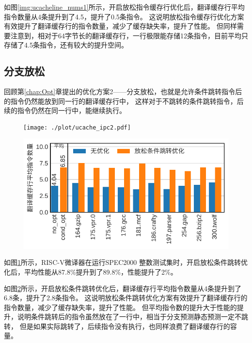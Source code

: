 如图\ref{img:ucacheline_nums1}所示，开启放松指令缓存行优化后，翻译缓存行平均指令数量从4条提升到了4.5，提升了0.5条指令。
这说明放松指令缓存行优化方案有效提升了翻译缓存行的指令数量，减少了缓存缺失率，提升了性能。
但同样需要注意到，相对于64字节长的翻译缓存行，一行极限能存储12条指令，目前平均只存储了4.5条指令，还有较大的提升空间。

\subsection{分支放松}

回顾第\ref{chap:Opt}章提出的优化方案2——分支放松，也就是允许条件跳转指令后的指令仍然能放到同一行的翻译缓存行中，
这样对于不跳转的条件跳转指令，后续的指令仍然在同一行中，能继续执行。

\begin{figure}[!htbp]
  \centering
  \texttt{[image: ./plot/ucache\_ipc2.pdf]}
  \label{img:ipc2}
\end{figure}

\begin{figure}[!htbp]
  \centering
  \includegraphics[width=0.8\linewidth]{./plot/ucacheline_nums2.pdf}
  \label{img:ucacheline_nums2}
\end{figure}


如图\ref{img:ipc2}所示，RISC-V微译器在运行SPEC2000 整数测试集时，开启放松条件跳转优化后，平均性能从87.8\%提升到了89.8\%，性能提升了2\%。

如图\ref{img:ucacheline_nums2}所示，开启放松条件跳转优化后，翻译缓存行平均指令数量从4条提升到了6.8条，提升了2.8条指令。
这说明放松条件跳转优化方案有效提升了翻译缓存行的指令数量，减少了缓存缺失率，提升了性能。
但平均指令数的提升大于性能的提升，说明条件跳转后的指令虽然放在了一行中，相当于分支预测静态预测一定不跳转，
但是如果实际跳转了，后续指令没有执行，也同样浪费了翻译缓存行的容量。


